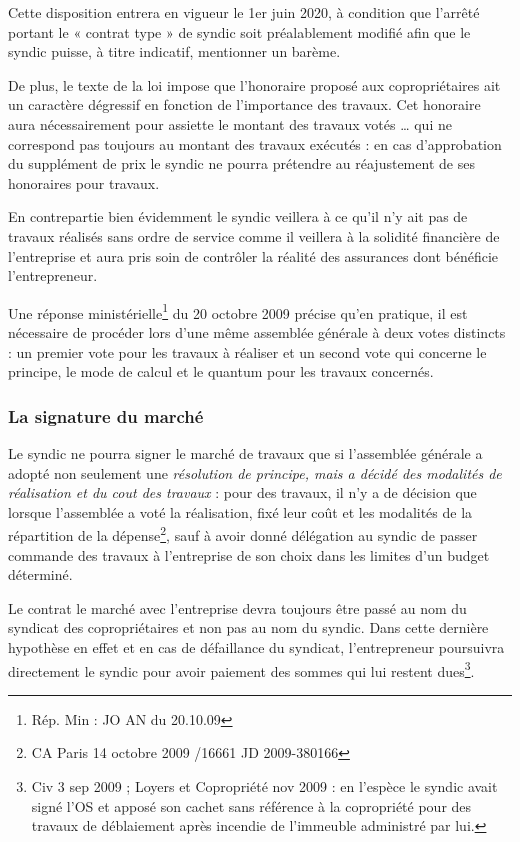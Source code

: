 			Cette disposition entrera en vigueur le 1er juin 2020, à condition que l’arrêté portant le « contrat type » de syndic soit préalablement modifié afin que le syndic puisse, à titre indicatif, mentionner un barème.
			
			De plus, le texte de la loi impose que l’honoraire proposé aux copropriétaires ait un caractère dégressif en fonction de l’importance des travaux. Cet honoraire aura nécessairement pour assiette le montant des travaux votés … qui ne correspond pas toujours au montant des travaux exécutés : en cas d’approbation du supplément de prix le syndic ne pourra prétendre au réajustement de ses honoraires pour travaux.
			
			En contrepartie bien évidemment le syndic veillera à ce qu'il n'y ait pas de travaux réalisés sans ordre de service comme il veillera à la solidité financière de l'entreprise et aura pris soin de contrôler la réalité des assurances dont bénéficie l'entrepreneur.
			
			Une réponse ministérielle\footnote{Rép. Min : JO AN du 20.10.09} du 20 octobre 2009 précise qu’en pratique, il est nécessaire de procéder lors d’une même assemblée générale à deux votes distincts : un premier vote pour les travaux à réaliser et un second vote qui concerne le principe, le mode de calcul et le quantum pour les travaux concernés.
		
		\subsubsection{La signature du marché}
		
			Le syndic ne pourra signer le marché de travaux que si l’assemblée générale a adopté non seulement une \emph{résolution de principe, mais a décidé des modalités de réalisation et du cout des travaux} : pour des travaux, il n’y a de décision que lorsque l’assemblée a voté la réalisation, fixé leur coût et les modalités de la répartition de la dépense\footnote{CA Paris 14 octobre 2009 /16661 JD 2009-380166}, sauf à avoir donné délégation au syndic de passer commande des travaux à l’entreprise de son choix dans les limites d’un budget déterminé.
			
			Le contrat le marché avec l'entreprise devra toujours être passé au nom du syndicat des copropriétaires et non pas au nom du syndic. Dans cette dernière hypothèse en effet et en cas de défaillance du syndicat, l'entrepreneur poursuivra directement le syndic pour avoir paiement des sommes qui lui restent dues\footnote{Civ 3 sep 2009 ; Loyers et Copropriété nov 2009  : en l’espèce le syndic avait signé l’OS et apposé son cachet sans référence à la copropriété pour des travaux de déblaiement après incendie de l’immeuble administré par lui.}.
			
